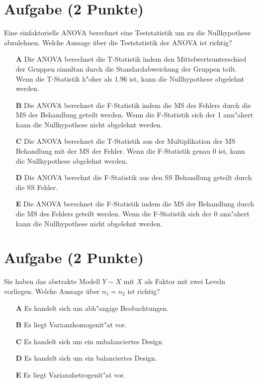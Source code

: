 \documentclass[a4paper, 9pt]{scrartcl}\usepackage[]{graphicx}\usepackage[]{xcolor}
\begin{document}
\section{Aufgabe \hfill (2 Punkte)}

Eine einfaktorielle ANOVA berechnet eine Teststatistik um zu die Nullhypothese abzulehnen. Welche Aussage {\"u}ber die Teststatistik der ANOVA ist richtig?



\begin{enumerate}
\item [\textbf{A} \msquare] Die ANOVA berechnet die T-Statistik indem den Mittelwertsunterschied der Gruppen simultan durch die Standardabweichung der Gruppen teilt. Wenn die T-Statistik h{"o}her als 1.96 ist, kann die Nullhypothese abgelehnt werden.
\item [\textbf{B} \msquare] Die ANOVA berechnet die F-Statistik indem die MS des Fehlers durch die MS der Behandlung geteilt werden. Wenn die F-Statistik sich der 1 ann{"a}hert kann die Nullhypothese nicht abgelehnt werden.
\item [\textbf{C} \msquare] Die ANOVA berechnet die T-Statistik aus der Multiplikation der MS Behandlung mit der MS der Fehler. Wenn die F-Statistik genau 0 ist, kann die Nullhypothese abgelehnt werden.
\item [\textbf{D} \msquare] Die ANOVA berechnt die F-Statistik aus den SS Behandlung geteilt durch die SS Fehler.
\item [\textbf{E} \msquare] Die ANOVA berechnet die F-Statistik indem die MS der Behandlung durch die MS des Fehlers geteilt werden. Wenn die F-Statistik sich der 0 ann{"a}hert kann die Nullhypothese nicht abgelehnt werden.
\end{enumerate} 

\section{Aufgabe \hfill (2 Punkte)}




Sie haben das abstrakte Modell $Y \sim X$ mit $X$ als Faktor mit zwei
Leveln vorliegen. Welche Aussage {\"u}ber $n_1 = n_2$ ist richtig?



\begin{enumerate}
\item [\textbf{A} \msquare] Es handelt sich um abh{"a}ngige Beobachtungen.
\item [\textbf{B} \msquare] Es liegt Varianzhomogenit{"a}t vor.
\item [\textbf{C} \msquare] Es handelt sich um ein unbalanciertes Design
\item [\textbf{D} \msquare] Es handelt sich um ein balanciertes Design.
\item [\textbf{E} \msquare] Es liegt Varianzhetrogenit{"a}t vor.
\end{enumerate} 
\end{document}
